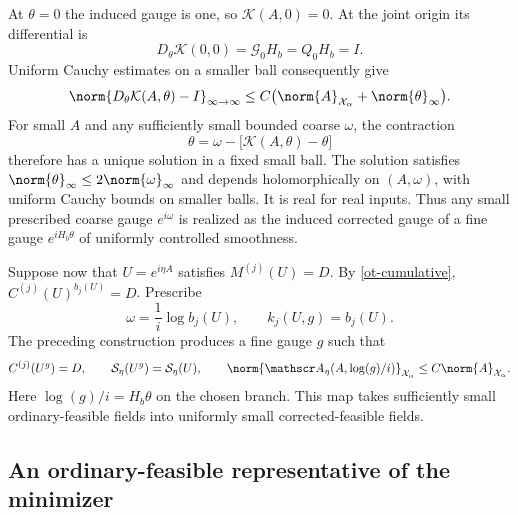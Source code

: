 At $\theta=0$ the induced gauge is one, so
$\mathcal K(A,0)=0$. At the joint origin its differential is
\begin{equation}\label{ot-K-linear}
 D_\theta\mathcal K(0,0)=\mathcal G_0H_b=Q_0H_b=I.
\end{equation}
Uniform Cauchy estimates on a smaller ball consequently give
\begin{equation}\label{ot-K-near-identity}
 \norm{D_\theta\mathcal K(A,\theta)-I}_{\infty\to\infty}
       \le C\bigl(\norm{A}_{\mathcal X_\alpha}
                                    +\norm{\theta}_\infty\bigr).
\end{equation}
For small $A$ and any sufficiently small bounded coarse
$\omega$, the contraction
\[
 \theta=\omega-\bigl[\mathcal K(A,\theta)-\theta\bigr]
\]
therefore has a unique solution in a fixed small ball.
The solution satisfies $\norm{\theta}_\infty\le2\norm{\omega}_\infty$
and depends holomorphically on $(A,\omega)$, with uniform
Cauchy bounds on smaller balls. It is real for real inputs.
Thus any small prescribed coarse gauge $e^{i\omega}$ is
realized as the induced corrected gauge of a fine gauge
$e^{iH_b\theta}$ of uniformly controlled smoothness.

Suppose now that $U=e^{i\eta A}$ satisfies
$M^{(j)}(U)=D$. By \eqref{ot-cumulative},
$C^{(j)}(U)^{b_j(U)}=D$. Prescribe
\[
 \omega=\frac1i\log b_j(U),\qquad k_j(U,g)=b_j(U).
\]
The preceding construction produces a fine gauge $g$ such that
\begin{equation}\label{ot-ordinary-to-corrected}
 C^{(j)}(U^g)=D,\qquad
 \mathcal S_\eta(U^g)=\mathcal S_\eta(U),\qquad
 \norm{\mathscr A_\eta(A,\log(g)/i)}_{\mathcal X_\alpha}
                     \le C\norm{A}_{\mathcal X_\alpha}.
\end{equation}
Here $\log(g)/i=H_b\theta$ on the chosen branch. This map
takes sufficiently small ordinary-feasible fields into
uniformly small corrected-feasible fields.

\subsection{An ordinary-feasible representative of the minimizer}

